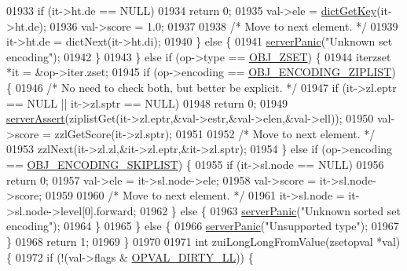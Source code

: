\begin{DoxyCode}
01933             \textcolor{keywordflow}{if} (it->ht.de == NULL)
01934                 \textcolor{keywordflow}{return} 0;
01935             val->ele = \hyperlink{dict_8h_a3271c334309904a3086deca94f96e46e}{dictGetKey}(it->ht.de);
01936             val->score = 1.0;
01937 
01938             \textcolor{comment}{/* Move to next element. */}
01939             it->ht.de = dictNext(it->ht.di);
01940         \} \textcolor{keywordflow}{else} \{
01941             \hyperlink{server_8h_a11cc378e7778a830b41240578de3b204}{serverPanic}(\textcolor{stringliteral}{"Unknown set encoding"});
01942         \}
01943     \} \textcolor{keywordflow}{else} \textcolor{keywordflow}{if} (op->type == \hyperlink{server_8h_a8c356422ddbc03bd77694880a30a1953}{OBJ\_ZSET}) \{
01944         iterzset *it = &op->iter.zset;
01945         \textcolor{keywordflow}{if} (op->encoding == \hyperlink{server_8h_aabf064ede983103f1fd0df2086e84eee}{OBJ\_ENCODING\_ZIPLIST}) \{
01946             \textcolor{comment}{/* No need to check both, but better be explicit. */}
01947             \textcolor{keywordflow}{if} (it->zl.eptr == NULL || it->zl.sptr == NULL)
01948                 \textcolor{keywordflow}{return} 0;
01949             \hyperlink{server_8h_a88114b5169b4c382df6b56506285e56a}{serverAssert}(ziplistGet(it->zl.eptr,&val->estr,&val->elen,&val->ell));
01950             val->score = zzlGetScore(it->zl.sptr);
01951 
01952             \textcolor{comment}{/* Move to next element. */}
01953             zzlNext(it->zl.zl,&it->zl.eptr,&it->zl.sptr);
01954         \} \textcolor{keywordflow}{else} \textcolor{keywordflow}{if} (op->encoding == \hyperlink{server_8h_acfb35db5cb30ed113ed23aeb1a224c4c}{OBJ\_ENCODING\_SKIPLIST}) \{
01955             \textcolor{keywordflow}{if} (it->sl.node == NULL)
01956                 \textcolor{keywordflow}{return} 0;
01957             val->ele = it->sl.node->ele;
01958             val->score = it->sl.node->score;
01959 
01960             \textcolor{comment}{/* Move to next element. */}
01961             it->sl.node = it->sl.node->level[0].forward;
01962         \} \textcolor{keywordflow}{else} \{
01963             \hyperlink{server_8h_a11cc378e7778a830b41240578de3b204}{serverPanic}(\textcolor{stringliteral}{"Unknown sorted set encoding"});
01964         \}
01965     \} \textcolor{keywordflow}{else} \{
01966         \hyperlink{server_8h_a11cc378e7778a830b41240578de3b204}{serverPanic}(\textcolor{stringliteral}{"Unsupported type"});
01967     \}
01968     \textcolor{keywordflow}{return} 1;
01969 \}
01970 
01971 \textcolor{keywordtype}{int} zuiLongLongFromValue(zsetopval *val) \{
01972     \textcolor{keywordflow}{if} (!(val->flags & \hyperlink{t__zset_8c_a9999cca84f897ad3930ec05f5fbd4c6a}{OPVAL\_DIRTY\_LL})) \{

\end{DoxyCode}
